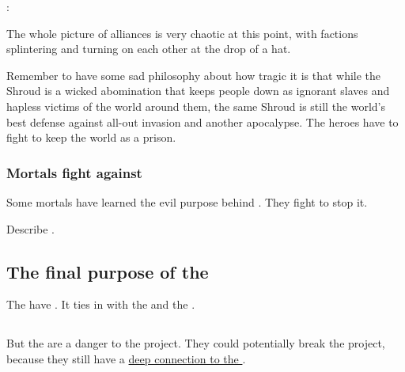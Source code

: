 \begin{garbage}
\Ishnaruchaefir: 

The whole picture of alliances is very chaotic at this point, with factions splintering and turning on each other at the drop of a hat.

Remember to have some sad philosophy about how tragic it is that while the Shroud is a wicked abomination that keeps people down as ignorant slaves and hapless victims of the world around them, the same Shroud is still the world's best defense against all-out invasion and another apocalypse. 
The heroes have to fight to keep the world as a prison. 





\subsubsection{Mortals fight against \iquin}
Some mortals have learned the evil purpose behind \iquin. 
They fight to stop it. 

Describe . 









\subsection{The final purpose of the \Sephiroth}
The \hyperref[Sephiroth]{\Sephiroth} have . 
It ties in with the  and the . 







\subsection{\Kezerad}
But the \hs{\Kezeradi} are a danger to the \Sephirah{} project. They could potentially break the project, because they still have a \hyperref[Kezeradi telepathy]{deep connection to the \Sephiroth}.


\end{garbage}
